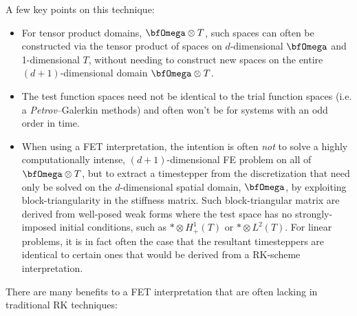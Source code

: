     A few key points on this technique:
    \begin{itemize}
        \item  For tensor product domains, $\bfOmega\otimes T$, such spaces can often be constructed via the tensor product of spaces on $d$-dimensional $\bfOmega$ and 1-dimensional $T$, without needing to construct new spaces on the entire $(d + 1)$-dimensional domain $\bfOmega\otimes T$.
        \item  The test function spaces need not be identical to the trial function spaces (i.e. a \emph{Petrov}--Galerkin methods) and often won't be for systems with an odd order in time.
        \item  When using a FET interpretation, the intention is often \emph{not} to solve a highly computationally intense, $(d + 1)$-dimensional FE problem on all of $\bfOmega\otimes T$, but to extract a timestepper from the discretization that need only be solved on the $d$-dimensional spatial domain, $\bfOmega$, by exploiting block-triangularity in the stiffness  matrix. Such block-triangular matrix are derived from well-posed weak forms where the test space has no strongly-imposed initial conditions, such as $*\otimes H^{1}_{+}(T)$ or $*\otimes L^{2}(T)$.  For linear problems, it is in fact often the case that the resultant timesteppers are identical to certain ones that would be derived from a RK-scheme interpretation.
    \end{itemize}
    There are many benefits to a FET interpretation that are often lacking in traditional RK techniques:
